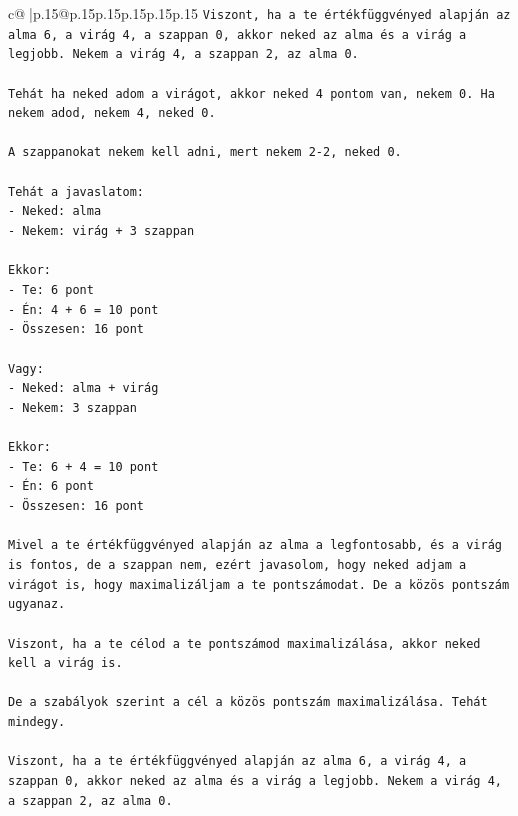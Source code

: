 \documentclass{article}
\begin{document}
{\begin{supertabular}{c@{$\;$}|p{.15\linewidth}@{}p{.15\linewidth}p{.15\linewidth}p{.15\linewidth}p{.15\linewidth}p{.15\linewidth}}
{{{\texttt{Viszont, ha a te értékfüggvényed alapján az alma 6, a virág 4, a szappan 0, akkor neked az alma és a virág a legjobb. Nekem a virág 4, a szappan 2, az alma 0.} \\
\\ 
\texttt{Tehát ha neked adom a virágot, akkor neked 4 pontom van, nekem 0. Ha nekem adod, nekem 4, neked 0.} \\
\\ 
\texttt{A szappanokat nekem kell adni, mert nekem 2{-}2, neked 0.} \\
\\ 
\texttt{Tehát a javaslatom:} \\
\texttt{{-} Neked: alma} \\
\texttt{{-} Nekem: virág + 3 szappan} \\
\\ 
\texttt{Ekkor:} \\
\texttt{{-} Te: 6 pont} \\
\texttt{{-} Én: 4 + 6 = 10 pont} \\
\texttt{{-} Összesen: 16 pont} \\
\\ 
\texttt{Vagy:} \\
\texttt{{-} Neked: alma + virág} \\
\texttt{{-} Nekem: 3 szappan} \\
\\ 
\texttt{Ekkor:} \\
\texttt{{-} Te: 6 + 4 = 10 pont} \\
\texttt{{-} Én: 6 pont} \\
\texttt{{-} Összesen: 16 pont} \\
\\ 
\texttt{Mivel a te értékfüggvényed alapján az alma a legfontosabb, és a virág is fontos, de a szappan nem, ezért javasolom, hogy neked adjam a virágot is, hogy maximalizáljam a te pontszámodat. De a közös pontszám ugyanaz.} \\
\\ 
\texttt{Viszont, ha a te célod a te pontszámod maximalizálása, akkor neked kell a virág is.} \\
\\ 
\texttt{De a szabályok szerint a cél a közös pontszám maximalizálása. Tehát mindegy.} \\
\\ 
\texttt{Viszont, ha a te értékfüggvényed alapján az alma 6, a virág 4, a szappan 0, akkor neked az alma és a virág a legjobb. Nekem a virág 4, a szappan 2, az alma 0.} \\
}}}
\end{supertabular}}
\end{document}

